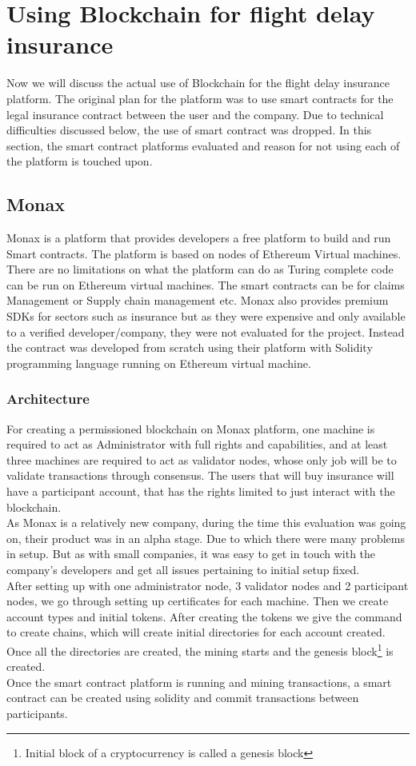 \section{Using Blockchain for flight delay insurance}
Now we will discuss the actual use of Blockchain for the flight delay insurance platform. The original plan for the platform was to use smart contracts for the legal insurance contract between the user and the company. Due to technical difficulties discussed below, the use of smart contract was dropped. In this section, the smart contract platforms evaluated and reason for not using each of the platform is touched upon.

\subsection{Monax}
Monax is a platform that provides developers a free platform to build and run Smart contracts. The platform is based on nodes of Ethereum Virtual machines. There are no limitations on what the platform can do as Turing complete code can be run on Ethereum virtual machines. The smart contracts can be for claims Management or Supply chain management etc. Monax also provides premium SDKs for sectors such as insurance but as they were expensive and only available to a verified developer/company, they were not evaluated for the project. Instead the contract was developed from scratch using their platform with Solidity programming language running on Ethereum virtual machine. 
\subsubsection{Architecture}
For creating a permissioned blockchain on Monax platform, one machine is  required to act as Administrator with full rights and capabilities, and at least three machines are required to act as validator nodes, whose only job will be to validate transactions through consensus. The users that will buy insurance will have a participant account, that has the rights limited to just interact with the blockchain.
\\As Monax is a relatively new company, during the time this evaluation was going on, their product was in an alpha stage. Due to which there were many problems in setup. But as with small companies, it was easy to get in touch with the company's developers and get all  issues pertaining to initial setup fixed. 
\\After setting up with one administrator node, 3 validator nodes and 2 participant nodes, we go through setting up certificates for each machine. Then we create account types and initial tokens. After creating the tokens we give the command to create chains, which will create initial directories for each account created. Once all the directories are created, the mining starts and the genesis block\footnote{Initial block of a cryptocurrency is called a genesis block} is created.
\\Once the smart contract platform is running and mining transactions, a smart contract can be created using solidity and commit transactions between participants.


